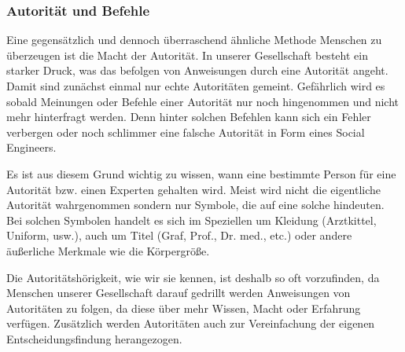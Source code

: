 \subsubsection{Autorität und Befehle}\label{sec:autorität-und-befehle}
Eine gegensätzlich und dennoch überraschend ähnliche Methode Menschen zu überzeugen ist die Macht der Autorität. In unserer Gesellschaft besteht ein starker Druck, was das befolgen von Anweisungen durch eine Autorität angeht. Damit sind zunächst einmal nur echte Autoritäten gemeint. Gefährlich wird es sobald Meinungen oder Befehle einer Autorität nur noch hingenommen und nicht mehr hinterfragt werden. Denn hinter solchen Befehlen kann sich ein Fehler verbergen oder noch schlimmer eine falsche Autorität in Form eines Social Engineers.

Es ist aus diesem Grund wichtig zu wissen, wann eine bestimmte Person für eine Autorität bzw. einen Experten gehalten wird. Meist wird nicht die eigentliche Autorität wahrgenommen sondern nur Symbole, die auf eine solche hindeuten. Bei solchen Symbolen handelt es sich im Speziellen um Kleidung (Arztkittel, Uniform, usw.), auch um Titel (Graf, Prof., Dr. med., etc.) oder andere äußerliche Merkmale wie die Körpergröße.

Die Autoritätshörigkeit, wie wir sie kennen, ist deshalb so oft vorzufinden, da Menschen unserer Gesellschaft darauf gedrillt werden Anweisungen von Autoritäten zu folgen, da diese über mehr Wissen, Macht oder Erfahrung verfügen. Zusätzlich werden Autoritäten auch zur Vereinfachung der eigenen Entscheidungsfindung herangezogen. \cite{cialdini}

